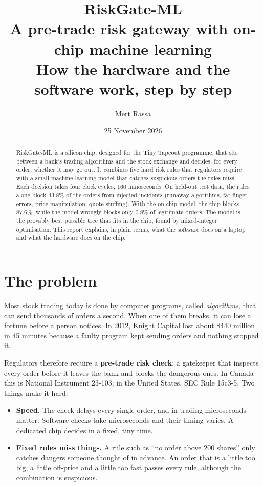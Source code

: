 \documentclass[11pt,a4paper]{article}
\title{\textbf{RiskGate-ML}\\[4pt]
  \large A pre-trade risk gateway with on-chip machine learning\\
  How the hardware and the software work, step by step}
\author{Mert Rassa}
\date{25 November 2026}
\begin{document}
\maketitle

\begin{abstract}
\noindent
RiskGate-ML is a silicon chip, designed for the Tiny Tapeout programme, that sits between
a bank's trading algorithms and the stock exchange and decides, for every order, whether it
may go out. It combines five hard risk rules that regulators require with a small
machine-learning model that catches suspicious orders the rules miss. Each decision takes
four clock cycles, 160 nanoseconds. On held-out test data, the rules alone block 43.8\% of
the orders from injected incidents (runaway algorithms, fat-finger errors, price
manipulation, quote stuffing). With the on-chip model, the chip blocks 87.6\%, while the model
wrongly blocks only 0.8\% of legitimate orders. The model is the provably best possible
tree that fits in the chip, found by mixed-integer optimisation. This report explains,
in plain terms, what the software does on a laptop and what the hardware does on the chip.
\end{abstract}

\tableofcontents
\newpage

\section{The problem}

Most stock trading today is done by computer programs, called \emph{algorithms}, that can send
thousands of orders a second. When one of them breaks, it can lose a fortune before a person
notices. In 2012, Knight Capital lost about \$440 million in 45 minutes because a faulty
program kept sending orders and nothing stopped it.

Regulators therefore require a \textbf{pre-trade risk check}: a gatekeeper that inspects every
order before it leaves the bank and blocks the dangerous ones. In Canada this is National
Instrument 23-103; in the United States, SEC Rule 15c3-5. Two things make it hard:

\begin{itemize}
  \item \textbf{Speed.} The check delays every single order, and in trading microseconds matter.
        Software checks take microseconds and their timing varies. A dedicated chip decides in a
        fixed, tiny time.
  \item \textbf{Fixed rules miss things.} A rule such as ``no order above 200 shares'' only
        catches dangers someone thought of in advance. An order that is a little too big,
        a little off-price and a little too fast passes every rule, although the combination
        is suspicious.
\end{itemize}
\end{document}
